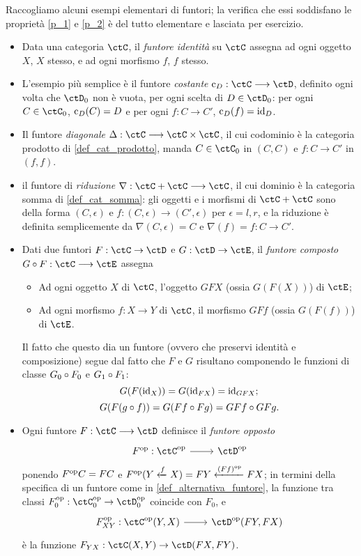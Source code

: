 \begin{examples}\label{es_di_funtori}
	Raccogliamo alcuni esempi elementari di funtori; la verifica che essi soddisfano le proprietà \ref{p_1} e \ref{p_2} è del tutto elementare e lasciata per esercizio.
	\begin{itemize}
		\item \label{exfun_1} Data una categoria \(\ctC\), il \emph{funtore identità} su \(\ctC\) assegna ad ogni oggetto \(X\), \(X\) stesso, e ad ogni morfismo \(f\), \(f\) stesso.
		\item \label{exfun_2} L'esempio più semplice è il funtore \emph{costante} \(\const_D : \ctC\fun\ctD\), definito ogni volta che \(\ctD_0\) non è vuota, per ogni scelta di \(D\in\ctD_0\): per ogni \(C\in\ctC_0\), \(\text{c}_D(C)=D\) e per ogni \(f : C\to C'\), \(\text{c}_D(f)=\mathrm{id}_D\).
		\item \label{exfun_3} Il funtore \emph{diagonale} \(\Delta : \ctC \fun\ctC\times\ctC\), il cui codominio è la categoria prodotto di \ref{def_cat_prodotto}, manda \(C\in\ctC_0\) in \((C,C)\) e \(f : C\to C'\) in \((f,f)\).
		\item {}\label{exfun_4} il funtore di \emph{riduzione} \(\nabla : \ctC+\ctC \fun\ctC\), il cui dominio è la categoria somma di \ref{def_cat_somma}: gli oggetti e i morfismi di \(\ctC+\ctC\) sono della forma \((C,\epsilon)\) e \(f : (C,\epsilon) \to (C',\epsilon)\) per \(\epsilon=l,r\), e la riduzione è definita semplicemente da \(\nabla(C,\epsilon)=C\) e \(\nabla(f)=f : C\to C'\).
		\item \label{exfun_5} Dati due funtori \(F:\ctC\to\ctD\) e \(G:\ctD\to\ctE\), il \emph{funtore composto} \(G\cmp F:\ctC\fun\ctE\) assegna
		      \begin{itemize}
			      \item Ad ogni oggetto \(X\) di \(\ctC\), l'oggetto \(GFX\) (ossia \(G(F(X))\)) di \(\ctE\);
			      \item Ad ogni morfismo \(f:X\to Y\) di \(\ctC\), il morfismo \(GFf\) (ossia \(G(F(f))\)) di \(\ctE\).
		      \end{itemize}
		      Il fatto che questo dia un funtore (ovvero che preservi identità e composizione) segue dal fatto che \(F\) e \(G\) risultano componendo le funzioni di classe \(G_0\circ F_0\) e \(G_1\circ F_1\):
		      \[
			      G(F(\mathrm{id}_X)) = G(\mathrm{id}_{FX}) = \mathrm{id}_{GFX} ;
		      \]
		      \[
			      G(F(g\circ f)) = G(Ff\circ Fg) = GFf\circ GFg .
		      \]
		\item Ogni funtore \(F : \ctC\fun\ctD\) definisce il \emph{funtore opposto}
		      \[\dmFun{F^\op}{\ctC^\op}{\ctD^\op}\]
		      ponendo \(F^{\text{op}} C=FC\) e \(F^{\text{op}}(Y \xleftarrow{f} X) = FY \xleftarrow{(Ff)^{\text{op}}} FX\); in termini della specifica di un funtore come in \ref{def_alternativa_funtore}, la funzione tra classi \(F^\op_0 : \ctC^\op_0\to\ctD^\op_0\) coincide con \(F_0\), e
		      \[\dmFun{F_{XY}^\op}{\Hom{\ctC^\op}(Y,X)}{\Hom{\ctD^\op}(FY,FX)}\]
		      è la funzione \(F_{YX} : \Hom{\ctC}(X,Y)\to \Hom{\ctD}(FX,FY)\).
	\end{itemize}
\end{examples}
